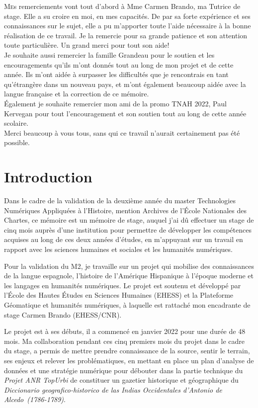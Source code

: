 \documentclass[a4paper,12pt,twoside]{book}
\begin{document}
\lettrine{M}es remerciements vont tout d'abord à Mme Carmen Brando, ma Tutrice de stage. Elle a su croire en moi, en mes capacités. De par sa forte expérience et ses connaissances sur le sujet, elle a pu m’apporter toute l’aide nécessaire à la bonne réalisation de ce travail. Je la remercie pour sa grande patience et son attention toute particulière. Un grand merci pour tout son aide!  \\
	
\noindent Je souhaite aussi remercier la famille Grandeau pour le soutien et les encouragements qu’ils m’ont donnés tout au long de mon projet et de cette année. Ils m’ont aidée à surpasser les difficultés que je rencontrais en tant qu’étrangère dans un nouveau pays, et m’ont également beaucoup aidée avec la langue française et la correction de ce mémoire. \\

\noindent Également je souhaite remercier mon ami de la promo TNAH 2022, Paul Kervegan pour tout l'encouragement et son soutien tout au long de cette année scolaire. \\

\noindent Merci beaucoup à vous tous, sans qui ce travail n’aurait certainement pas été possible.
	
	
	
	\chapter{Introduction}
Dans le cadre de la validation de la deuxième année du master Technologies Numériques Appliquées à l’Histoire, mention Archives de l’École Nationales des Chartes, ce mémoire est un mémoire de stage, auquel j’ai dû effectuer un stage de cinq mois auprès d’une institution pour permettre de développer les compétences acquises au long de ces deux années d’études, en m’appuyant sur un travail en rapport avec les sciences humaines et sociales et les humanités numériques.

Pour la validation du M2, je travaille sur un projet qui mobilise des connaissances de la langue espagnole, l’histoire de l’Amérique Hispanique à l’époque moderne et les langages en humanités numériques. Le projet est soutenu et développé par l’École des Hautes Études en Sciences Humaines (\Gls{EHESS}) et la Plateforme Géomatique et humanités numériques, à laquelle est rattaché mon encadrante de stage Carmen Brando (EHESS/CNR). 

Le projet est à ses débuts, il a commencé en janvier 2022 pour une durée de 48 mois. Ma collaboration pendant ces cinq premiers mois du projet dans le cadre du stage, a permis de mettre prendre connaissance de la source, sentir le terrain, ses enjeux et relever les problématiques, en mettant en place un plan d’analyse de données et une stratégie numérique pour débouter dans la partie technique du \textit{Projet ANR TopUrbi} de constituer un gazetier historique et géographique du \textit{Diccionario geografico-historico de las Indias Occidentales d’Antonio de Alcedo (1786-1789)}.
\end{document}
